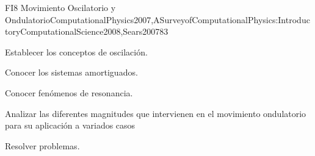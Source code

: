 \begin{syllabus}
\begin{unit}{FI8 Movimiento Oscilatorio y Ondulatorio}{ComputationalPhysics2007,ASurveyofComputationalPhysics:IntroductoryComputationalScience2008,Sears2007}{8}{3}
   \begin{unitgoals}
      \item Establecer los conceptos de oscilación.
      \item Conocer los sistemas amortiguados.
      \item Conocer fenómenos de resonancia.
      \item Analizar las diferentes magnitudes que intervienen en el movimiento ondulatorio para su aplicación a variados casos
      \item Resolver problemas.
   \end{unitgoals}
\end{unit}



\begin{coursebibliography}
\end{coursebibliography}

\end{syllabus}
